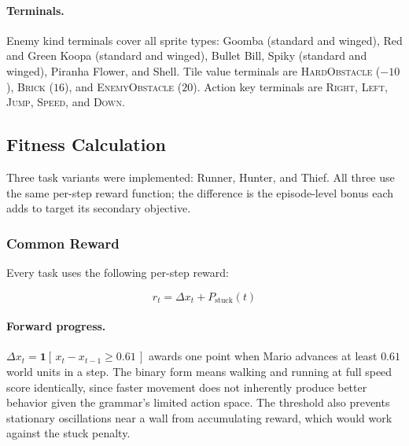 \documentclass[runningheads]{llncs}
\begin{document}
\paragraph{Terminals.}
Enemy kind terminals cover all sprite types: Goomba (standard and winged), Red and Green Koopa (standard and winged), Bullet Bill, Spiky (standard and winged), Piranha Flower, and Shell. Tile value terminals are \textsc{HardObstacle} ($-10$), \textsc{Brick} ($16$), and \textsc{EnemyObstacle} ($20$). Action key terminals are \textsc{Right}, \textsc{Left}, \textsc{Jump}, \textsc{Speed}, and \textsc{Down}.


\subsection{Fitness Calculation}
\label{sec:fitness}

Three task variants were implemented: Runner, Hunter, and Thief. All three use the same per-step reward function; the difference is the episode-level bonus each adds to target its secondary objective.

\subsubsection{Common Reward}

Every task uses the following per-step reward:

\begin{equation}
r_t = \Delta x_t + P_{\text{stuck}}(t)
\label{eq:step_reward}
\end{equation}

\paragraph{Forward progress.}
$\Delta x_t = \mathbf{1}[\,x_t - x_{t-1} \geq 0.61\,]$ awards one point when Mario advances at least $0.61$ world units in a step. The binary form means walking and running at full speed score identically, since faster movement does not inherently produce better behavior given the grammar's limited action space. The threshold also prevents stationary oscillations near a wall from accumulating reward, which would work against the stuck penalty.
\end{document}
